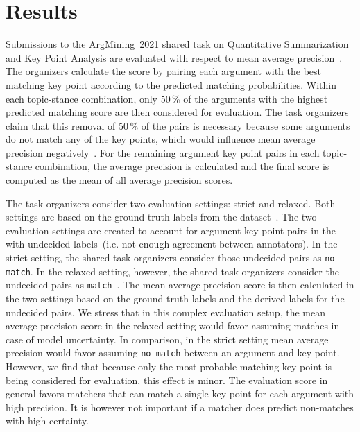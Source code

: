 \section{Results}\label{results}


Submissions to the ArgMining~2021 shared task on Quantitative Summarization and Key Point Analysis are evaluated with 
respect to mean average precision~\cite{kpa-2021-overview}.%
The organizers calculate the score by pairing each argument with the best matching key point according to the predicted 
matching probabilities.
Within each topic-stance combination, only 50\,\% of the arguments with the highest predicted matching score are then 
considered for evaluation.
The task organizers claim that this removal of 50\,\% of the pairs is necessary because some arguments do not match any 
of the key points, which would influence mean average precision negatively~\cite{kpa-2021-overview}. %
For the remaining argument key point pairs in each topic-stance combination, the average precision is calculated and the 
final score is computed as the mean of all average precision scores.

The task organizers consider two evaluation settings: strict and relaxed.
Both settings are based on the ground-truth labels from the \ArgKP dataset~\cite{Bar-HaimEFKLS2020}. The two evaluation settings are created to account for argument key point pairs in the \ArgKP with undecided labels~(i.e. not enough agreement between annotators). In the strict setting,
the shared task organizers consider those undecided pairs as \texttt{no-match}. In the relaxed setting, however, the shared task organizers consider the undecided pairs as \texttt{match}~\cite{kpa-2021-overview}. %
The mean average precision score is then calculated in the two settings based on the ground-truth labels and the derived labels for the undecided pairs. 
We stress that in this complex evaluation setup, the mean average precision score in the relaxed setting would 
favor assuming matches in case of model uncertainty.
In comparison, in the strict setting mean average precision would favor assuming \texttt{no-match} between an argument and key point.
However, we find that because only the most probable matching key point is being considered for evaluation, this effect is minor.
The evaluation score in general favors matchers that can match a single key point for each argument with high precision.
It is however not important if a matcher does predict non-matches with high certainty.


